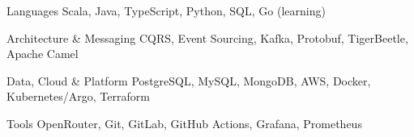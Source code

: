 
\begin{cvskills}

  \cvskill
    {Languages} %
    {Scala, Java, TypeScript, Python, SQL, Go (learning)} %

  \cvskill
    {Architecture \& Messaging} %
    {CQRS, Event Sourcing, Kafka, Protobuf, TigerBeetle, Apache Camel} %

  \cvskill
    {Data, Cloud \& Platform} %
    {PostgreSQL, MySQL, MongoDB, AWS, Docker, Kubernetes/Argo, Terraform} %

  \cvskill
    {Tools} %
    {OpenRouter, Git, GitLab, GitHub Actions, Grafana, Prometheus} %

\end{cvskills}